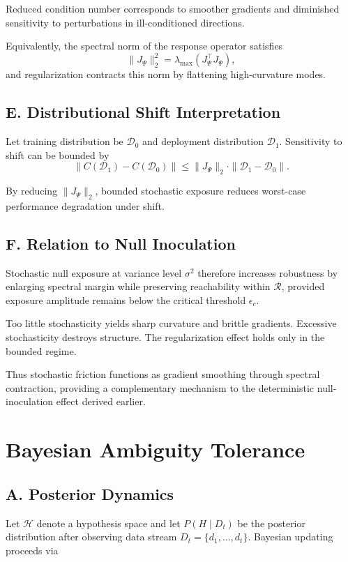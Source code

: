 \documentclass[11pt]{article}
\theoremstyle{remark}
\begin{document}
Reduced condition number corresponds to smoother gradients and diminished sensitivity to perturbations in ill-conditioned directions.

Equivalently, the spectral norm of the response operator satisfies
\[
\|J_\Psi\|_2^2
=
\lambda_{\max}(J_\Psi^\top J_\Psi),
\]
and regularization contracts this norm by flattening high-curvature modes.

\subsection*{E. Distributional Shift Interpretation}

Let training distribution be $\mathcal{D}_0$ and deployment distribution $\mathcal{D}_1$. Sensitivity to shift can be bounded by
\[
\|C(\mathcal{D}_1) - C(\mathcal{D}_0)\|
\le
\|J_\Psi\|_2 \cdot \|\mathcal{D}_1 - \mathcal{D}_0\|.
\]

By reducing $\|J_\Psi\|_2$, bounded stochastic exposure reduces worst-case performance degradation under shift.

\subsection*{F. Relation to Null Inoculation}

Stochastic null exposure at variance level $\sigma^2$ therefore increases robustness by enlarging spectral margin while preserving reachability within $\mathcal{R}$, provided exposure amplitude remains below the critical threshold $\epsilon_c$.

Too little stochasticity yields sharp curvature and brittle gradients. Excessive stochasticity destroys structure. The regularization effect holds only in the bounded regime.

Thus stochastic friction functions as gradient smoothing through spectral contraction, providing a complementary mechanism to the deterministic null-inoculation effect derived earlier.

\section{Bayesian Ambiguity Tolerance}
\label{app:bayesian}

\subsection*{A. Posterior Dynamics}

Let $\mathcal{H}$ denote a hypothesis space and let $P(H \mid D_t)$ be the posterior distribution after observing data stream $D_t = \{d_1,\dots,d_t\}$. Bayesian updating proceeds via
\end{document}
